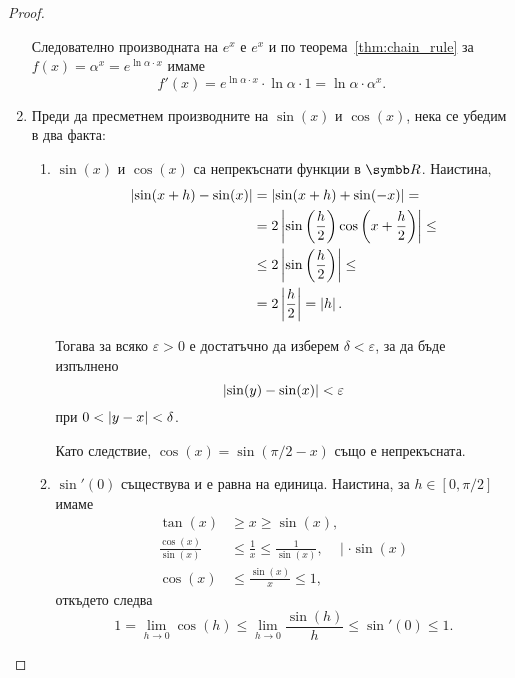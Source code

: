 \documentclass[numbers=endperiod, bibliography=totocnumbered]{scrartcl}
\begin{document}
\begin{proof}
\begin{enumerate}
    Следователно производната на \( e^x \) е \( e^x \) и по теорема~\ref{thm:chain_rule} за \( f(x) = \alpha^x = e^{\ln \alpha \cdot x} \) имаме
    \begin{equation*}
      f'(x)
      =
      e^{\ln \alpha \cdot x} \cdot \ln \alpha \cdot 1
      =
      \ln \alpha \cdot \alpha^x.
    \end{equation*}

    \item Преди да пресметнем производните на \( \sin(x) \) и \( \cos(x) \), нека се убедим в два факта:
    \begin{enumerate}
      \item \( \sin(x) \) и \( \cos(x) \) са непрекъснати функции в \( \R \). Наистина,
      \begin{align*}
        \left\vert \sin(x+h) - \sin(x) \right\vert
        &=
        \left\vert \sin(x+h) + \sin(-x) \right\vert
        = \\ &=
        2 \left\vert \sin\left(\frac h 2 \right) \cos \left( x+ \frac h 2 \right) \right\vert
        \leq \\ &\leq
        2 \left\vert \sin\left(\frac h 2 \right) \right\vert
        \leq \\ &=
        2 \left\vert \frac h 2 \right\vert
        =
        \left\vert h \right\vert.
      \end{align*}

      Тогава за всяко \( \varepsilon > 0 \) е достатъчно да изберем \( \delta < \varepsilon \), за да бъде изпълнено
      \begin{equation*}
        \left\vert \sin(y) - \sin(x) \right\vert < \varepsilon
      \end{equation*}
      при \( 0 < \left\vert y - x \right\vert < \delta \).

      Като следствие, \( \cos(x) = \sin(\pi / 2 - x) \) също е непрекъсната.

      \item \( \sin'(0) \) съществува и е равна на единица. Наистина, за \( h \in [0, \pi / 2] \) имаме
      \begin{align*}
        \tan(x) &\geq x \geq \sin(x),
        \\
        \frac {\cos(x)} {\sin(x)} &\leq \frac 1 x \leq \frac 1 {\sin(x)},~~~~\mid \cdot \sin(x)
        \\
        \cos(x) &\leq \frac {\sin(x)} x \leq 1,
      \end{align*}
      откъдето следва
      \begin{equation*}
        1
        =
        \lim_{h \to 0} \cos(h)
        \leq
        \lim_{h \to 0} \frac {\sin(h)} h
        \leq
        \sin'(0)
        \leq
        1.
      \end{equation*}
    \end{enumerate}


\end{enumerate}
\end{proof}
\end{document}
